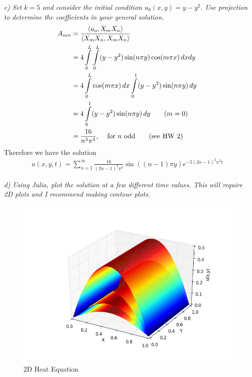 \documentclass[12pt]{article}
\theoremstyle{remark}
\begin{document}
\textit{c) Set $k = 5$ and consider the initial condition $u_0(x,y) = y - y^2$. Use projection to determine the coefficients in your general solution.} \\

\begin{align*}
	A_{mn} & = \frac{\braket{u_o,X_mX_n}}{\braket{X_mX_n,X_mX_n}}
	\\ & = 4\int\limits_0^L \int\limits_0^L (y-y^2)\sin(n\pi y)\cos(m\pi x) \, dxdy 
	\\ & = 4\int\limits_0^L \cos(m\pi x) \, dx \int\limits_0^1 (y-y^2)\sin(n\pi y) \, dy
	\\ & = 4\int\limits_0^1 (y - y^2)\sin(n\pi y) \, dy \tag{$m=0$} 
	\\ & = \frac{16}{n^3\pi^3} \text{, \quad for $n$ odd} \tag{see HW 2} 
\end{align*}
Therefore we have the solution
\begin{align*}
	u(x,y,t) = \sum\limits_{n=1}^\infty \frac{16}{(2n-1)^3\pi^3}\sin((n-1)\pi y)e^{-5(2n-1)^2\pi^2t}
\end{align*}

\textit{d) Using Julia, plot the solution at a few different time values. This will require 2D plots and I recommend making contour plots.} 


\newpage

\begin{figure}[h]
	\centering
	\includegraphics[width=15cm]{figure_1.png}
	\caption{2D Heat Equation}
\end{figure}
\end{document}

